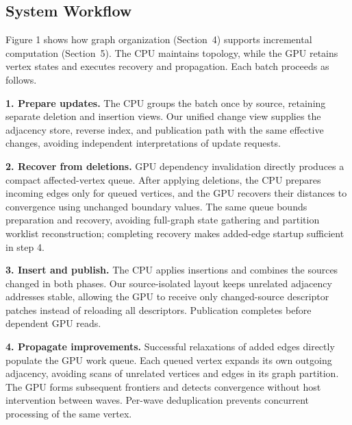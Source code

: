 \subsection{System Workflow}

Figure 1 shows how graph organization (Section~4) supports incremental computation (Section~5). The CPU maintains topology, while the GPU retains vertex states and executes recovery and propagation. Each batch proceeds as follows.

\textbf{1. Prepare updates.} The CPU groups the batch once by source, retaining separate deletion and insertion views. Our unified change view supplies the adjacency store, reverse index, and publication path with the same effective changes, avoiding independent interpretations of update requests.

\textbf{2. Recover from deletions.} GPU dependency invalidation directly produces a compact affected-vertex queue. After applying deletions, the CPU prepares incoming edges only for queued vertices, and the GPU recovers their distances to convergence using unchanged boundary values. The same queue bounds preparation and recovery, avoiding full-graph state gathering and partition worklist reconstruction; completing recovery makes added-edge startup sufficient in step 4.

\textbf{3. Insert and publish.} The CPU applies insertions and combines the sources changed in both phases. Our source-isolated layout keeps unrelated adjacency addresses stable, allowing the GPU to receive only changed-source descriptor patches instead of reloading all descriptors. Publication completes before dependent GPU reads.

\textbf{4. Propagate improvements.} Successful relaxations of added edges directly populate the GPU work queue. Each queued vertex expands its own outgoing adjacency, avoiding scans of unrelated vertices and edges in its graph partition. The GPU forms subsequent frontiers and detects convergence without host intervention between waves. Per-wave deduplication prevents concurrent processing of the same vertex.


